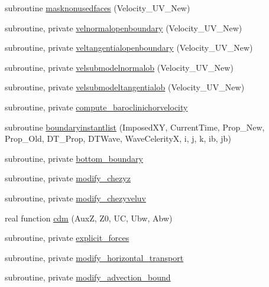 \begin{DoxyCompactItemize}
\item 
subroutine \mbox{\hyperlink{namespacemodulehydrodynamic_ab4a3acec600d04e2afbf5acc7f68b642}{masknonusedfaces}} (Velocity\+\_\+\+U\+V\+\_\+\+New)
\item 
subroutine, private \mbox{\hyperlink{namespacemodulehydrodynamic_af23df453cb52dbe604e896aba3b572aa}{velnormalopenboundary}} (Velocity\+\_\+\+U\+V\+\_\+\+New)
\item 
subroutine, private \mbox{\hyperlink{namespacemodulehydrodynamic_a0be051dfb2855eb7014145fceaa64075}{veltangentialopenboundary}} (Velocity\+\_\+\+U\+V\+\_\+\+New)
\item 
subroutine, private \mbox{\hyperlink{namespacemodulehydrodynamic_aca265830a6a43d55606480ef5abdb2af}{velsubmodelnormalob}} (Velocity\+\_\+\+U\+V\+\_\+\+New)
\item 
subroutine, private \mbox{\hyperlink{namespacemodulehydrodynamic_ac476fd6c2f59116c8cbcbed954fdbc5f}{velsubmodeltangentialob}} (Velocity\+\_\+\+U\+V\+\_\+\+New)
\item 
subroutine, private \mbox{\hyperlink{namespacemodulehydrodynamic_a5548f1e73131ae2e60c1386848706e83}{compute\+\_\+baroclinichorvelocity}}
\item 
subroutine \mbox{\hyperlink{namespacemodulehydrodynamic_a1e87e450d8be8b7bee682d2ef22558f8}{boundaryinstantlist}} (Imposed\+XY, Current\+Time, Prop\+\_\+\+New, Prop\+\_\+\+Old, D\+T\+\_\+\+Prop, D\+T\+Wave, Wave\+CelerityX, i, j, k, ib, jb)
\item 
subroutine, private \mbox{\hyperlink{namespacemodulehydrodynamic_a560d4076559adb32fe2884f63e0b13da}{bottom\+\_\+boundary}}
\item 
subroutine, private \mbox{\hyperlink{namespacemodulehydrodynamic_a4b8bde093197fe02063699036c456839}{modify\+\_\+chezyz}}
\item 
subroutine, private \mbox{\hyperlink{namespacemodulehydrodynamic_a8e14732a1f66519f456c093908a3ee4b}{modify\+\_\+chezyveluv}}
\item 
real function \mbox{\hyperlink{namespacemodulehydrodynamic_a5465756a3c0bc0b2789b8cbffd16ec64}{cdm}} (AuxZ, Z0, UC, Ubw, Abw)
\item 
subroutine, private \mbox{\hyperlink{namespacemodulehydrodynamic_a789f1e7896025efc57bee4107cc31422}{explicit\+\_\+forces}}
\item 
subroutine, private \mbox{\hyperlink{namespacemodulehydrodynamic_a4bfe52cf1e114fade20b4037cfdf542a}{modify\+\_\+horizontal\+\_\+transport}}
\item 
subroutine, private \mbox{\hyperlink{namespacemodulehydrodynamic_a07085db86ddaf25769704243d0003e91}{modify\+\_\+advection\+\_\+bound}}

\end{DoxyCompactItemize}
